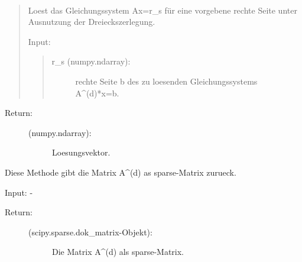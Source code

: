 \documentclass[letterpaper,10pt,ngerman]{sphinxmanual}
\begin{document}
\begin{fulllineitems}
\begin{fulllineitems}
\begin{description}
\begin{description}
\end{description}

\end{description}

\end{fulllineitems}


\begin{fulllineitems}
\label{\detokenize{index:sparse_erw.Sparse.lgs_lsg}}~\begin{quote}

Loest das Gleichungssystem Ax=r\_s für eine vorgebene rechte Seite unter Ausnutzung der
Dreieckszerlegung.

Input:
\begin{quote}
\begin{description}
\item[{r\_s (numpy.ndarray):}] \leavevmode
rechte Seite b des zu loesenden Gleichungssystems A\textasciicircum{}(d)*x=b.

\end{description}
\end{quote}
\end{quote}
\begin{description}
\item[{Return:}] \leavevmode\begin{description}
\item[{(numpy.ndarray):}] \leavevmode
Loesungsvektor.

\end{description}

\end{description}

\end{fulllineitems}


\begin{fulllineitems}
\label{\detokenize{index:sparse_erw.Sparse.return_mat_d}}
Diese Methode gibt die Matrix A\textasciicircum{}(d) as sparse-Matrix zurueck.

Input: -
\begin{description}
\item[{Return:}] \leavevmode\begin{description}
\item[{(scipy.sparse.dok\_matrix-Objekt):}] \leavevmode
Die Matrix A\textasciicircum{}(d) als sparse-Matrix.


\end{description}
\end{description}
\end{fulllineitems}
\end{fulllineitems}
\end{document}
